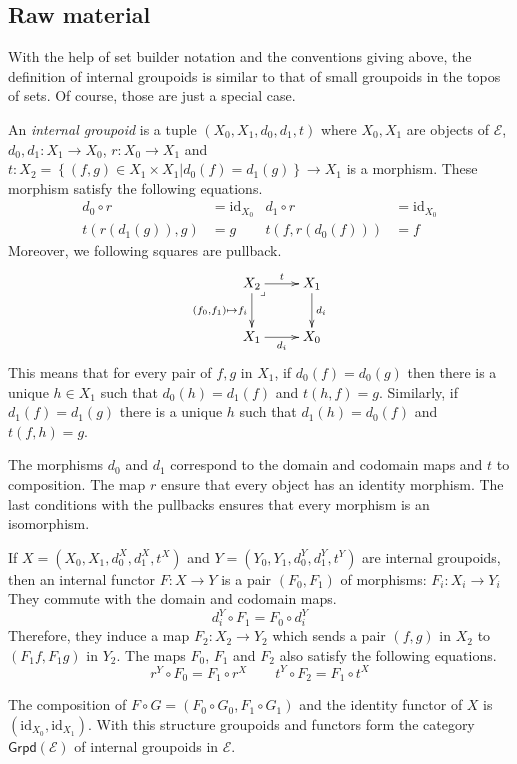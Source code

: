 \documentclass{amsart}
\theoremstyle{plain}
\theoremstyle{definition}
\newcommand\cat\mathcal
\newcommand\set[1]{\left\{#1\right\}}
\newcommand\id{\mathrm{id}}
\begin{document}
\subsection{Raw material}\label{internal}
With the help of set builder notation and the conventions giving above, the definition of internal groupoids is similar to that of small groupoids in the topos of sets. Of course, those are just a special case.

An \emph{internal groupoid} is a tuple $(X_0,X_1,d_0,d_1,t)$ where $X_0, X_1$ are objects of $\cat E$, $d_0,d_1:X_1 \to X_0$, $r:X_0 \to X_1$ and $t:X_2 = \set{(f,g)\in X_1\times X_1| d_0(f) = d_1(g) } \to X_1$ is a morphism. These morphism satisfy the following equations.
\begin{align*}
d_0\circ r &= \id_{X_0}&
d_1\circ r &= \id_{X_0}\\
t(r(d_1(g)),g) &=g&
t(f,r(d_0(f))) &=f
\end{align*}
Moreover, we following squares are pullback.
\[ \xymatrix{
X_2 \ar[r]^t\ar[d]_{(f_0,f_1)\mapsto f_i}\ar@{}[dr]|<\lrcorner & X_1 \ar[d]^{d_i}\\
X_1 \ar[r]_{d_i} & X_0
}\]
This means that for every pair of $f,g$ in $X_1$, if $d_0(f) = d_0(g)$ then there is a unique $h\in X_1$ such that $d_0(h) = d_1(f)$ and $t(h,f) = g$. Similarly, if $d_1(f) = d_1(g)$ there is a unique $h$ such that $d_1(h) = d_0(f)$ and $t(f,h) = g$.

The morphisms $d_0$ and $d_1$ correspond to the domain and codomain maps and $t$ to composition. The map $r$ ensure that every object has an identity morphism. The last conditions with the pullbacks ensures that every morphism is an isomorphism.

If $X = (X_0,X_1,d^X_0,d^X_1,t^X)$ and $Y = (Y_0,Y_1,d^Y_0,d^Y_1,t^Y)$ are internal groupoids, then an internal functor $F:X\to Y$ is a pair $(F_0,F_1)$ of morphisms: $F_i:X_i\to Y_i$ They commute with the domain and codomain maps.
\[ d^Y_i\circ F_1 = F_0 \circ d^Y_i \]
Therefore, they induce a map $F_2: X_2 \to Y_2$ which sends a pair $(f,g)$ in $X_2$ to $(F_1f,F_1g)$ in $Y_2$. The maps $F_0$, $F_1$ and $F_2$ also satisfy the following equations.
\[ r^Y\circ F_0 = F_1 \circ r^X \qquad t^Y\circ F_2 = F_1 \circ t^X\]

\newcommand\grpd{\mathsf{Grpd}}\newcommand\inv{^{-1}}
The composition of $F\circ G = (F_0\circ G_0,F_1\circ G_1)$ and the identity functor of $X$ is $(\id_{X_0},\id_{X_1})$. With this structure groupoids and functors form the category $\grpd(\cat E)$ of internal groupoids in $\cat E$.
\end{document}
